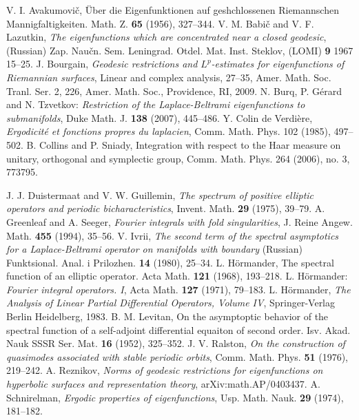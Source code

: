 \documentclass[10pt]{amsart}
\begin{document}
\begin{thebibliography}{99}

 V. I. Avakumovi\v c, \"Uber die Eigenfunktionen auf geshchlossenen Riemannschen Mannigfaltigkeiten.
Math. Z. {\bf 65} (1956), 327--344.
 V. M. Babi\v c and V. F. Lazutkin, {\em The eigenfunctions which are
concentrated near a closed geodesic}, (Russian)  Zap. Nau\v cn. Sem. Leningrad. Otdel. Mat. Inst. Steklov, (LOMI)  {\bf 9}  1967 15--25.
 J. Bourgain, {\em Geodesic restrictions and $L^p$-estimates
for eigenfunctions of Riemannian surfaces}, Linear and complex
analysis, 27--35, Amer. Math. Soc. Tranl. Ser. 2, 226, Amer. Math. Soc., Providence, RI, 2009.
 N. Burq, P. G\'erard and N. Tzvetkov: {\em Restriction of the Laplace-Beltrami eigenfunctions to submanifolds}, Duke Math. J.  {\bf 138}
(2007), 445--486.
 Y. Colin de Verdi\`ere, {\em Ergodicit\'e et fonctions propres du laplacien},
 Comm. Math. Phys.  102  (1985),  497--502.
  B. Collins and P.  Sniady, Integration with respect to the Haar measure on unitary,
orthogonal and symplectic group, Comm. Math. Phys. 264 (2006), no.
3, 773795.

 J. J. Duistermaat and V. W. Guillemin, {\em The spectrum of positive elliptic operators and periodic bicharacteristics},  Invent. Math.  {\bf 29}  (1975), 39--79.
 A. Greenleaf and A. Seeger, {\em Fourier integrals with fold
singularities}, J. Reine Angew. Math. {\bf 455} (1994), 35--56.
 V. Ivrii, {\em The second term of the spectral asymptotics for a Laplace-Beltrami operator on manifolds with boundary} (Russian)  Funktsional. Anal. i Prilozhen.  {\bf 14}  (1980), 25--34.
 L. H\"ormander, The spectral function of an elliptic operator. Acta Math.
{\bf 121} (1968), 193--218.
 L. H\"ormander: {\em Fourier integral operators. I},  Acta Math.  {\bf 127}  (1971), 79--183.
  L. H\"ormander, {\em The Analysis of Linear Partial
Differential Operators, Volume IV}, Springer-Verlag Berlin Heidelberg, 1983.
  B. M. Levitan, On the asymptoptic behavior of the spectral function of a self-adjoint differential
equaiton of second order. Isv. Akad. Nauk SSSR Ser. Mat. {\bf 16} (1952), 325--352.
 J. V. Ralston, {\em On the construction of quasimodes associated with stable periodic orbits},  Comm. Math. Phys.  {\bf 51}  (1976), 219--242.
 A. Reznikov, {\em Norms of geodesic restrictions for eigenfunctions on hyperbolic
surfaces and representation theory}, arXiv:math.AP/0403437.
 A. Schnirelman, {\em Ergodic properties of eigenfunctions}, Usp. Math. Nauk. {\bf 29} (1974), 181--182.


\end{thebibliography}
\end{document}
